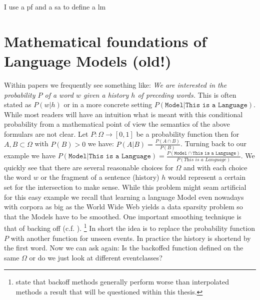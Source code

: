 \documentclass[•]{book}
\begin{document}


I use a \gls{pf} and a \gls{sa} to define a \gls{lm}

\printnoidxglossaries

\chapter{Mathematical foundations of Language Models (old!)}

Within papers we frequently see something like: \textit{We are interested in the probability $P$ of a word $w$ given a history $h$ of preceding words.}
This is often stated as $P(w|h)$ or in a more concrete setting $P(\texttt{Model}|\texttt{This is a Language})$. 
While most readers will have an intuition what is meant with this conditional probability from a mathematical point of view the semantics of the above formulars are not clear.
Let $P:\Omega \rightarrow [0,1]$ be a probability function then for $A,B \subset \Omega$ with $P(B)>0$ we have: $P(A|B)=\frac{P(A\cap B)}{P(B)}$.
Turning back to our example we have $P(\texttt{Model}|\texttt{This is a Language}) = \frac{P(\texttt{Model}\cap\texttt{This is a Language})}{P(\textit{This is a Language})}$.
We quickly see that there are several reasonable choices for $\Omega$ and with each choice the word $w$ or the fragment of a sentence (history) $h$ would represent a certain set for the intersection to make sense.
While this problem might seam artificial for this easy example we recall that learning a language Model even nowadays with corpora as big as the World Wide Web yields a data sparsity problem so that the Models have to be smoothed. 
One important smoothing technique is that of backing off (c.f. \cite{katz}\cite{kneser:ney:1994}). \footnote{\cite{chen:goodman} state that backoff methods generally perform worse than interpolated methods a result that will be questioned within this thesis.}
In short the idea is to replace the probability function $P$ with another function for unseen events. 
In practice the history is shortend by the first word. 
Now we can ask again: Is the backoffed function defined on the same $\Omega$ or do we just look at different eventclasses?
\end{document}
